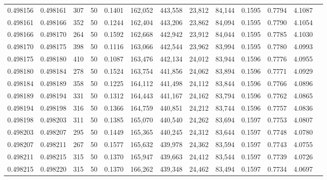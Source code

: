 \begin{tabular}{rrrrrrrrrrrrr}
0.498156 & 0.498161 & 307 &  50 &                                     0.1401 & 162,052 & 443,558 &  23,812 &  84,144 & 0.1595 & 0.7794 & 4.1087 \\
0.498161 & 0.498166 & 352 &  50 &                                     0.1244 & 162,404 & 443,206 &  23,862 &  84,094 & 0.1595 & 0.7790 & 4.1054 \\
0.498166 & 0.498170 & 264 &  50 &                                     0.1592 & 162,668 & 442,942 &  23,912 &  84,044 & 0.1595 & 0.7785 & 4.1030 \\
0.498170 & 0.498175 & 398 &  50 &                                     0.1116 & 163,066 & 442,544 &  23,962 &  83,994 & 0.1595 & 0.7780 & 4.0993 \\
0.498175 & 0.498180 & 410 &  50 &                                     0.1087 & 163,476 & 442,134 &  24,012 &  83,944 & 0.1596 & 0.7776 & 4.0955 \\
0.498180 & 0.498184 & 278 &  50 &                                     0.1524 & 163,754 & 441,856 &  24,062 &  83,894 & 0.1596 & 0.7771 & 4.0929 \\
0.498184 & 0.498189 & 358 &  50 &                                     0.1225 & 164,112 & 441,498 &  24,112 &  83,844 & 0.1596 & 0.7766 & 4.0896 \\
0.498189 & 0.498194 & 331 &  50 &                                     0.1312 & 164,443 & 441,167 &  24,162 &  83,794 & 0.1596 & 0.7762 & 4.0865 \\
0.498194 & 0.498198 & 316 &  50 &                                     0.1366 & 164,759 & 440,851 &  24,212 &  83,744 & 0.1596 & 0.7757 & 4.0836 \\
0.498198 & 0.498203 & 311 &  50 &                                     0.1385 & 165,070 & 440,540 &  24,262 &  83,694 & 0.1597 & 0.7753 & 4.0807 \\
0.498203 & 0.498207 & 295 &  50 &                                     0.1449 & 165,365 & 440,245 &  24,312 &  83,644 & 0.1597 & 0.7748 & 4.0780 \\
0.498207 & 0.498211 & 267 &  50 &                                     0.1577 & 165,632 & 439,978 &  24,362 &  83,594 & 0.1597 & 0.7743 & 4.0755 \\
0.498211 & 0.498215 & 315 &  50 &                                     0.1370 & 165,947 & 439,663 &  24,412 &  83,544 & 0.1597 & 0.7739 & 4.0726 \\
0.498215 & 0.498220 & 315 &  50 &                                     0.1370 & 166,262 & 439,348 &  24,462 &  83,494 & 0.1597 & 0.7734 & 4.0697 \\

\end{tabular}
